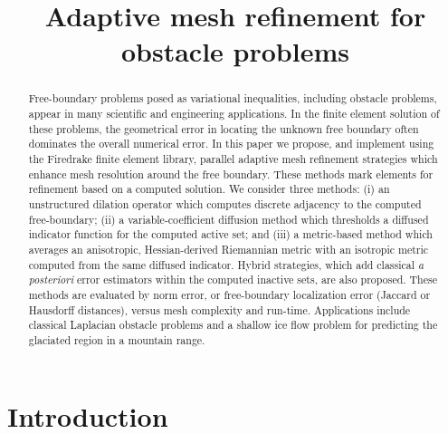 \documentclass[]{interact}
\theoremstyle{plain}%
\theoremstyle{definition}
\theoremstyle{remark}
\begin{document}

\title{Adaptive mesh refinement for obstacle problems}

\author{
}

\maketitle

\begin{abstract}
Free-boundary problems posed as variational inequalities, including obstacle problems, appear in many scientific and engineering applications.  In the finite element solution of these problems, the geometrical error in locating the unknown free boundary often dominates the overall numerical error.  In this paper we propose, and implement using the Firedrake finite element library, parallel adaptive mesh refinement strategies which enhance mesh resolution around the free boundary.  These methods mark elements for refinement based on a computed solution.  We consider three methods: (i) an unstructured dilation operator which computes discrete adjacency to the computed free-boundary; (ii) a variable-coefficient diffusion method which thresholds a diffused indicator function for the computed active set; and (iii) a metric-based method which averages an anisotropic, Hessian-derived Riemannian metric with an isotropic metric computed from the same diffused indicator.  Hybrid strategies, which add classical \emph{a posteriori} error estimators within the computed inactive sets, are also proposed.  These methods are evaluated by norm error, or free-boundary localization error (Jaccard or Hausdorff distances), versus mesh complexity and run-time.  Applications include classical Laplacian obstacle problems and a shallow ice flow problem for predicting the glaciated region in a mountain range.
\end{abstract}



\section{Introduction} \label{sec:intro}
\end{document}
